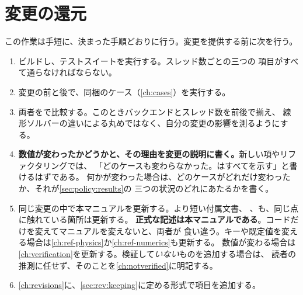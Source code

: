 \section{変更の還元}
\label{sec:extending:submitting}

この作業は手短に、決まった手順どおりに行う。変更を提供する前に次を行う。

\begin{enumerate}
  \item ビルドし、テストスイートを実行する。スレッド数ごとの三つの
    項目がすべて通らなければならない。
  \item 変更の前と後で、同梱のケース（\cref{ch:cases}）を実行する。
  \item 両者をで比較する。このときバックエンドとスレッド数を前後で揃え、
    線形ソルバーの違いによる丸めではなく、自分の変更の影響を測るようにする。
  \item \textbf{数値が変わったかどうかと、その理由を変更の説明に書く。}新しい項やリファクタリングでは、
    「どのケースも変わらなかった。はすべてを示す」と書けるはずである。
    何かが変わった場合は、どのケースがどれだけ変わったか、それが\cref{sec:policy:results}の
    三つの状況のどれにあたるかを書く。
  \item 同じ変更の中で本マニュアルを更新する。より短い付属文書、
    、も、同じ点に触れている箇所は更新する。
    \textbf{正式な記述は本マニュアルである}。コードだけを変えてマニュアルを変えないと、両者が
    食い違う。キーや既定値を変える場合は\cref{ch:ref-physics}か\cref{ch:ref-numerics}も更新する。
    数値が変わる場合は\cref{ch:verification}を更新する。検証して\emph{いない}ものを追加する場合は、
    読者の推測に任せず、そのことを\cref{ch:notverified}に明記する。
  \item \cref{ch:revisions}に、\cref{sec:rev:keeping}に定める形式で項目を追加する。
\end{enumerate}
